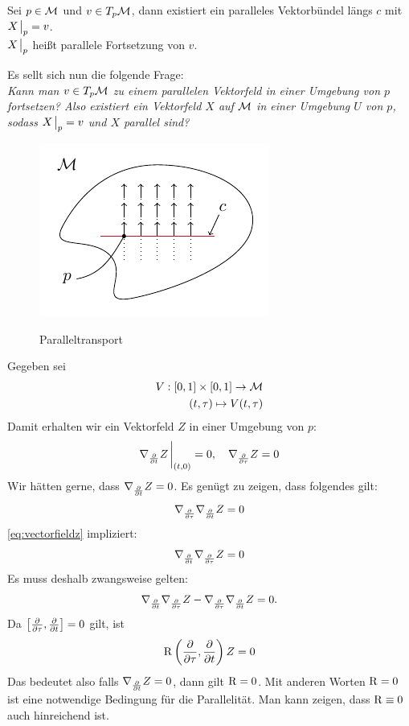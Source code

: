 \begin{defs}
Sei $p \in \mathcal{M}$ und $v \in T_p \mathcal{M}$, dann existiert ein paralleles Vektorbündel längs $c$ mit $X\eval_p = v$.\\
$X\eval_p$ heißt parallele Fortsetzung von $v$.
\end{defs}
Es sellt sich nun die folgende Frage:\\
\textit{Kann man $v \in T_p \mathcal{M}$ zu einem parallelen Vektorfeld in einer Umgebung von $p$ fortsetzen?
Also existiert ein Vektorfeld $X$ auf $\mathcal{M}$ in einer Umgebung $U$ von $p$, sodass $X\eval_p = v$ und $X$ parallel sind?}
\begin{figure}[H]
\centering
\includegraphics[width=0.6\linewidth]{figures/tikz/parallel_transport.pdf}
\label{img:parallel_transport}
\caption{Paralleltransport}
\end{figure} 
Gegeben sei 
\begin{align}
V: [0, 1] \times [0, 1] \to \mathcal{M}\\
(t, \tau) \mapsto V(t, \tau)
\end{align}
Damit erhalten wir ein Vektorfeld $Z$ in einer Umgebung von $p$:
\begin{align}
\label{eq:vectorfieldz}
\nabla_{\pdv{t}} Z \eval_{(t, 0)} = 0, \quad \nabla_{\pdv{\tau}} Z = 0
\end{align}
Wir hätten gerne, dass $\nabla_{\pdv{t}} Z = 0$.
Es genügt zu zeigen, dass folgendes gilt:
\begin{align}
\nabla_{\pdv{\tau}}\nabla_{\pdv{t}} Z = 0
\end{align}
\ref{eq:vectorfieldz} impliziert:
\begin{align}
\nabla_{\pdv{t}}\nabla_{\pdv{\tau}} Z = 0
\end{align}
Es muss deshalb zwangsweise gelten:
\begin{align}
\nabla_{\pdv{t}}\nabla_{\pdv{\tau}} Z - \nabla_{\pdv{\tau}}\nabla_{\pdv{t}} Z = 0.
\end{align}
Da $\comm{\pdv{\tau}}{\pdv{t}} = 0$ gilt, ist 
\begin{align}
\operatorname{R} \left( \pdv{\tau}, \pdv{t} \right) Z = 0
\end{align} 
Das bedeutet also falls $\nabla_{\pdv{t}}Z = 0$, dann gilt $\operatorname{R} = 0$.
Mit anderen Worten $\operatorname{R} = 0$ ist eine notwendige Bedingung für die Parallelität.
Man kann zeigen, dass $\operatorname{R} \equiv 0$ auch hinreichend ist.\\

